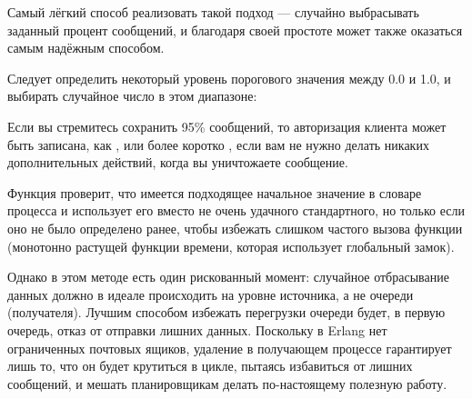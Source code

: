 Самый лёгкий способ реализовать такой подход --- случайно выбрасывать заданный процент сообщений, и благодаря своей простоте может также оказаться самым надёжным способом.

Следует определить некоторый уровень порогового значения между 0.0 и 1.0, и выбирать случайное число в этом диапазоне:


Если вы стремитесь сохранить 95\% сообщений, то авторизация клиента может быть записана, как , или более коротко , если вам не нужно делать никаких дополнительных действий, когда вы уничтожаете сообщение.

Функция  проверит, что имеется подходящее начальное значение в словаре процесса и использует его вместо не очень удачного стандартного, но только если оно не было определено ранее, чтобы избежать слишком частого вызова функции  (монотонно растущей функции времени, которая использует глобальный замок).

Однако в этом методе есть один рискованный момент: случайное отбрасывание данных должно в идеале происходить на уровне источника, а не очереди (получателя). Лучшим способом избежать перегрузки очереди будет, в первую очередь, отказ от отправки лишних данных. Поскольку в Erlang нет ограниченных почтовых ящиков, удаление в получающем процессе гарантирует лишь то, что он будет крутиться в цикле, пытаясь избавиться от лишних сообщений, и мешать планировщикам делать по-настоящему полезную работу.


